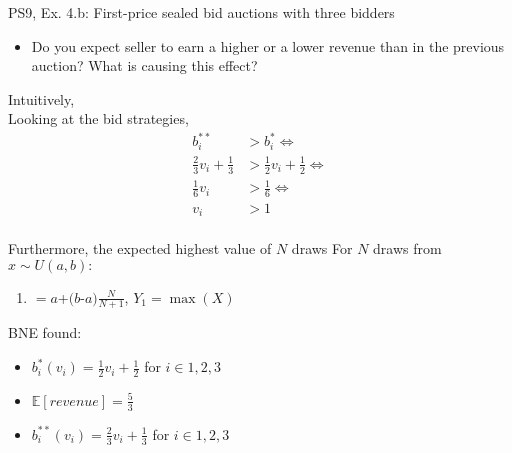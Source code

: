 \begin{frame}{PS9, Ex. 4.b: First-price sealed bid auctions with three bidders}
    \begin{itemize}
      \item[(b)] Do you expect seller to earn a higher or a lower revenue than in the previous auction? What is causing this effect?
    \end{itemize}
    \vspace{-8pt}
    \begin{multicols}{2}
    Intuitively, \\\smallskip
    Looking at the bid strategies,  \vspace{-2pt}
    \begin{align*}
      b_i^{**}&>b_i^{*}\Leftrightarrow\\
      \frac{2}{3}v_i+\frac{1}{3}&>\frac{1}{2}v_i+\frac{1}{2}\Leftrightarrow\\
      \frac{1}{6}v_i&>\frac{1}{6}\Leftrightarrow\\
                 v_i&>1
    \end{align*}
    \\\smallskip
    Furthermore, the expected highest value of $N$ draws 
    \vfill\null\columnbreak
    For $N$ draws from $x\sim U(a, b):$
    \vspace{-6pt}
    \begin{enumerate}
      \item[$\mathbb{E}(Y_1)$] $=a$+$(b$-$a)\frac{N}{N+1}$, $Y_1=\max(X)$
    \end{enumerate}
    \vspace{-6pt}
    BNE found:
    \begin{itemize}
      \item[(3.a)] $b_i^{*}(v_i)=\frac{1}{2}v_i+\frac{1}{2}$ for $i\in1,2,3$
      \item[(3.b)] $\mathbb{E}[revenue]=\frac{5}{3}$
      \item[(4.a)] $b_i^{**}(v_i)=\frac{2}{3}v_i+\frac{1}{3}$ for $i\in1,2,3$
    \end{itemize}
    \vfill\null
    \end{multicols}
\end{frame}


